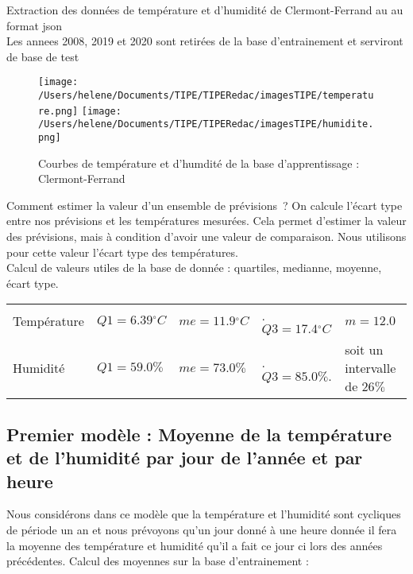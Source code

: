 \documentclass[11pt,a4paper]{article}
\begin{document}
Extraction des données de température et d'humidité de Clermont-Ferrand au au format json \\
Les annees 2008, 2019 et 2020 sont retirées de la base d'entrainement et serviront de base de test\\
\begin{figure} [!h]
\centering
\texttt{[image: /Users/helene/Documents/TIPE/TIPERedac/imagesTIPE/temperature.png]}\quad
\texttt{[image: /Users/helene/Documents/TIPE/TIPERedac/imagesTIPE/humidite.png]}
\caption{\label{fig:190101Lolita} Courbes de température et d'humdité de la base d'apprentissage : Clermont-Ferrand}
\end{figure}

Comment estimer la valeur d'un ensemble de prévisions~? On calcule l'écart type entre nos prévisions et les températures mesurées. Cela permet d'estimer la valeur des prévisions, mais à condition d'avoir une valeur de comparaison. Nous utilisons pour cette valeur l'écart type des températures.
 \\ Calcul de valeurs utiles de la base de donnée : quartiles, medianne, moyenne, écart type.\\ 
\begin{tabular}{lllll}\hline\hline
Température& $Q1 = 6.39{}^{\circ}C$ &$ me = 11.9 {}^{\circ}C$ &. $Q3 = 17.4{}^{\circ}C $&$ m= 12.0 $ \\
Humidité    &   $ Q1 = 59.0\%$           &$  me = 73.0\%  $           &. $Q3 = 85.0\%.           $&soit un intervalle de $ 26\% $\\
\hline 
\end{tabular} 




\subsection{Premier modèle : Moyenne de la température et de l'humidité par jour de l'année et par heure }
Nous considérons dans ce modèle que la température et l'humidité sont cycliques de période un an et nous prévoyons qu'un jour donné à une heure donnée il fera la moyenne des température et humidité qu'il a fait ce jour ci lors des années précédentes.
Calcul des moyennes sur la base d'entrainement : \\
\end{document}
